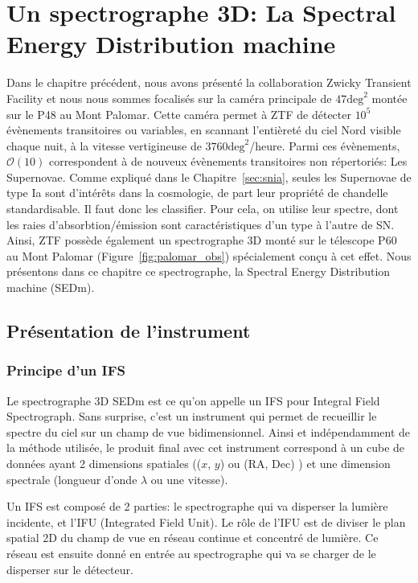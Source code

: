 \documentclass[../main/main.tex]{subfiles}
\begin{document}
\chapter{Un spectrographe 3D: La Spectral Energy Distribution machine}\label{ch:sedm}

\minitoc
\vspace{2cm}
Dans le chapitre précédent, nous avons présenté la collaboration Zwicky
Transient Facility et nous nous sommes focalisés sur la caméra
principale de $47\text{deg}^{2}$ montée sur le P48 au Mont
Palomar. Cette caméra permet à ZTF de détecter $10^{5}$ évènements
transitoires ou variables, en scannant l'entièreté du ciel Nord visible
chaque nuit,  à la vitesse
vertigineuse de $3760\text{deg}^{2}$/heure. Parmi ces évènements,
$\mathcal{O}(10)$ correspondent à de nouveux évènements transitoires non
répertoriés: Les Supernovae. Comme expliqué dans le
Chapitre~\ref{sec:snia}, seules les Supernovae de type Ia sont
d'intérêts dans la cosmologie, de part leur propriété de chandelle
standardisable. Il faut donc les classifier. Pour cela, on utilise leur
spectre, dont les raies d'absorbtion/émission sont caractéristiques d'un
type à l'autre de SN. Ainsi, ZTF possède également un spectrographe 3D
monté sur le télescope P60 au Mont Palomar
(Figure~\ref{fig:palomar_obs}) spécialement conçu à cet effet. Nous
présentons dans ce chapitre ce spectrographe, la Spectral Energy
Distribution machine (SEDm).
\newpage

\section{Présentation de l'instrument}
\label{sec:ifs}

\subsection{Principe d'un IFS}
Le spectrographe 3D SEDm est ce qu'on appelle un IFS pour Integral Field
Spectrograph. Sans surprise, c'est un instrument qui permet de
recueillir le spectre du ciel sur un champ de vue bidimensionnel.
Ainsi et indépendamment de la méthode utilisée, le produit final avec
cet instrument correspond à
un cube de données ayant 2 dimensions spatiales (($x$, $y$) ou (RA,
Dec) ) et une dimension spectrale (longueur d'onde $\lambda$ ou une
vitesse).

Un IFS est composé de 2 parties: le spectrographe qui va disperser la
lumière incidente, et l'IFU (Integrated Field Unit). Le rôle de l'IFU
est de diviser le plan spatial 2D du champ de vue en réseau continue
et concentré de lumière. Ce réseau est ensuite donné en entrée au
spectrographe qui va se charger de le disperser sur le détecteur.
\end{document}
